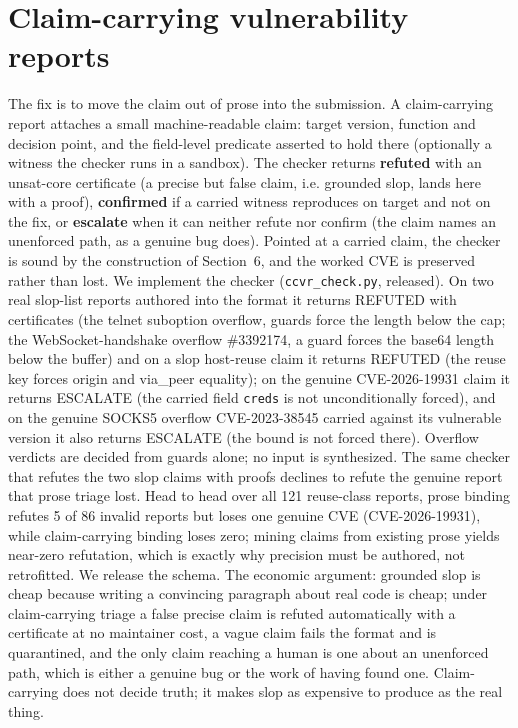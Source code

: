 \documentclass[11pt]{article}
\begin{document}
\section{Claim-carrying vulnerability reports}
The fix is to move the claim out of prose into the submission. A claim-carrying report attaches a small
machine-readable claim: target version, function and decision point, and the field-level predicate asserted to hold
there (optionally a witness the checker runs in a sandbox). The checker returns \textbf{refuted} with an unsat-core
certificate (a precise but false claim, i.e. grounded slop, lands here with a proof), \textbf{confirmed} if a carried
witness reproduces on target and not on the fix, or \textbf{escalate} when it can neither refute nor confirm (the
claim names an unenforced path, as a genuine bug does). Pointed at a carried claim, the checker is sound by the
construction of Section~6, and the worked CVE is preserved rather than lost. We implement the checker
(\texttt{ccvr\_check.py}, released). On two real slop-list reports authored into the format it returns REFUTED with
certificates (the telnet suboption overflow, guards force the length below the cap; the WebSocket-handshake overflow
\#3392174, a guard forces the base64 length below the buffer) and on a slop host-reuse claim it returns REFUTED (the
reuse key forces origin and via\_peer equality); on the genuine CVE-2026-19931 claim it returns ESCALATE (the carried
field \texttt{creds} is not unconditionally forced), and on the genuine SOCKS5 overflow CVE-2023-38545 carried
against its vulnerable version it also returns ESCALATE (the bound is not forced there). Overflow verdicts are
decided from guards alone; no input is synthesized. The same checker that refutes the two slop claims with proofs declines to refute the genuine
report that prose triage lost. Head to head over all 121 reuse-class reports, prose binding refutes 5 of 86 invalid
reports but loses one genuine CVE (CVE-2026-19931), while claim-carrying binding loses zero; mining claims from
existing prose yields near-zero refutation, which is exactly why precision must be authored, not retrofitted. We
release the schema. The economic
argument: grounded slop is cheap because writing a convincing paragraph about real code is cheap; under
claim-carrying triage a false precise claim is refuted automatically with a certificate at no maintainer cost, a
vague claim fails the format and is quarantined, and the only claim reaching a human is one about an unenforced path,
which is either a genuine bug or the work of having found one. Claim-carrying does not decide truth; it makes slop as
expensive to produce as the real thing.
\end{document}
